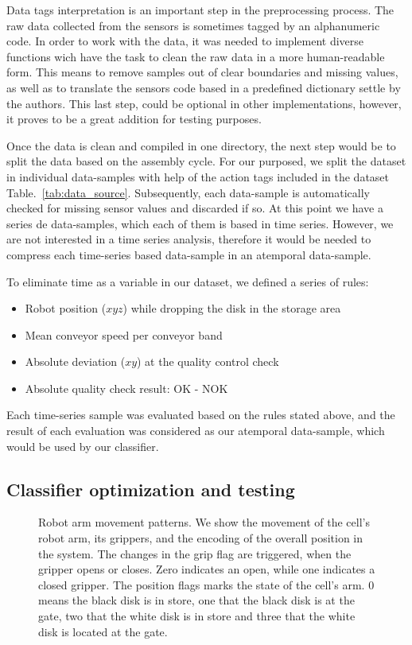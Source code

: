 \documentclass[5p,times,procedia]{elsarticle}
\begin{document}
Data tags interpretation is an important step in the preprocessing process. The raw data collected from the sensors is sometimes tagged by an alphanumeric code. In order to work with the data, it was needed to implement diverse functions wich have the task to clean the raw data in a more human-readable form. This means to remove samples out of clear boundaries and missing values, as well as to translate the sensors code based in a predefined dictionary settle by the authors. This last step, could be optional in other implementations, however, it proves to be a great addition for testing purposes.

Once the data is clean and compiled in one directory, the next step would be to split the data based on the assembly cycle. For our purposed, we split the dataset in individual data-samples with help of the action tags included in the dataset Table.~\ref{tab:data_source}. Subsequently, each data-sample is automatically checked for missing sensor values and discarded if so. At this point we have a series de data-samples, which each of them is based in time series. However, we are not interested in a time series analysis, therefore it would be needed to compress each time-series based data-sample in an atemporal data-sample.

To eliminate time as a variable in our dataset, we defined a series of rules:

\begin{itemize}
       \item Robot position ($xyz$) while dropping the disk in the storage area
       \item Mean conveyor speed per conveyor band
       \item Absolute deviation ($xy$) at the quality control check
       \item Absolute quality check result: OK - NOK
\end{itemize}

Each time-series sample was evaluated based on the rules stated above, and the result of each evaluation was considered as our atemporal data-sample, which would be used by our classifier.

\subsection{Classifier optimization and testing}\label{sec:ml_exp}

\begin{figure}
       
       \caption{Robot arm movement patterns. We show the movement of the 
                cell's robot arm, its grippers, and the encoding of the overall
                position in the system. The changes in the grip flag are triggered,
                when the gripper opens or closes. Zero indicates an open, while
                one indicates a closed gripper. The position flags marks the state
                of the cell's arm. 0 means the black disk is in store,
                one that the black disk is at the gate, two that the white disk
                is in store and three that the white disk is located at the gate.
             }
\label{fig:robot_pos_cell}
\end{figure}
\end{document}
